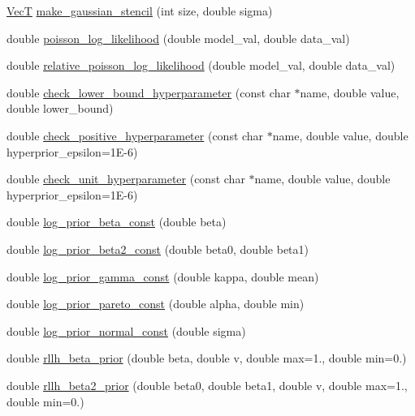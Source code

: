 \begin{DoxyCompactItemize}
\hyperlink{namespacemappel_a2225ad69f358daa3f4f99282a35b9a3a}{VecT} \hyperlink{namespacemappel_ae7764483ad8e545319cacd2e91a1a849}{make\+\_\+gaussian\+\_\+stencil} (int size, double sigma)
\item 
double \hyperlink{namespacemappel_ad6479b1e317a5f3bd2b92bfb562938d5}{poisson\+\_\+log\+\_\+likelihood} (double model\+\_\+val, double data\+\_\+val)
\item 
double \hyperlink{namespacemappel_a6e36ec38eee9f05906f51d4db8767b9e}{relative\+\_\+poisson\+\_\+log\+\_\+likelihood} (double model\+\_\+val, double data\+\_\+val)
\item 
double \hyperlink{namespacemappel_a9cd993c2d585a15b80f46d8d97381a0f}{check\+\_\+lower\+\_\+bound\+\_\+hyperparameter} (const char $\ast$name, double value, double lower\+\_\+bound)
\item 
double \hyperlink{namespacemappel_a545d3aeb521b1d098e8f060fbd24d5b3}{check\+\_\+positive\+\_\+hyperparameter} (const char $\ast$name, double value, double hyperprior\+\_\+epsilon=1\+E-\/6)
\item 
double \hyperlink{namespacemappel_af170ce3945b79af54277394ff3f62843}{check\+\_\+unit\+\_\+hyperparameter} (const char $\ast$name, double value, double hyperprior\+\_\+epsilon=1\+E-\/6)
\item 
double \hyperlink{namespacemappel_a9ca8f4d711a32790757590f2c60fa4cb}{log\+\_\+prior\+\_\+beta\+\_\+const} (double beta)
\item 
double \hyperlink{namespacemappel_aa76d20f90640303c9be2fd56a064aa56}{log\+\_\+prior\+\_\+beta2\+\_\+const} (double beta0, double beta1)
\item 
double \hyperlink{namespacemappel_a0485d74207be2d753c06a572693dd365}{log\+\_\+prior\+\_\+gamma\+\_\+const} (double kappa, double mean)
\item 
double \hyperlink{namespacemappel_ac21a7ae00d6e2d4baf30cbccc07ba70e}{log\+\_\+prior\+\_\+pareto\+\_\+const} (double alpha, double min)
\item 
double \hyperlink{namespacemappel_a514175d403ab15aa5bd58d0f96d8f79d}{log\+\_\+prior\+\_\+normal\+\_\+const} (double sigma)
\item 
double \hyperlink{namespacemappel_aba911d3a1a1a486fd6f6dfdfad37d90a}{rllh\+\_\+beta\+\_\+prior} (double beta, double v, double max=1., double min=0.)
\item 
double \hyperlink{namespacemappel_aaf6a672122290a7cb20a0d1c65661db7}{rllh\+\_\+beta2\+\_\+prior} (double beta0, double beta1, double v, double max=1., double min=0.)
\item 

\end{DoxyCompactItemize}
